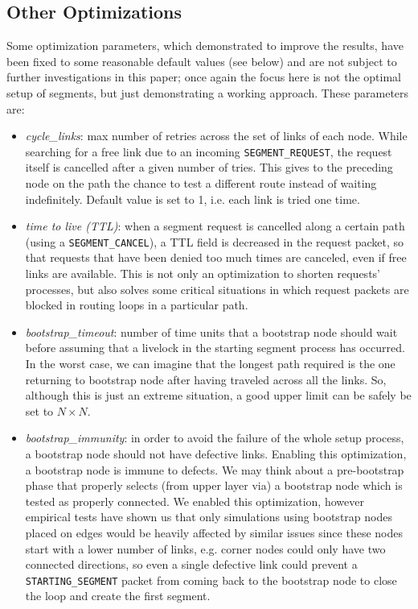 \subsection{Other Optimizations}
Some optimization parameters, which demonstrated to improve the \disr{}
results, have been fixed to some reasonable default values (see below) and are not subject to
further investigations in this paper; once again the focus here is not the
optimal setup of segments, but just demonstrating a working approach. 
These parameters are:
\begin{itemize}
\item \emph{cycle\_links}: max number of retries across the set of links of
each node. While searching for a free link due to an incoming \texttt{SEGMENT\_REQUEST},
the request itself is cancelled after a given number of tries. This
gives to the preceding node on the path the
chance to test a different route instead of waiting indefinitely.
Default value is set to 1, i.e. each link is tried one time.
\item \emph{time to live (TTL)}: when a segment request is cancelled
along a certain path (using a \texttt{SEGMENT\_CANCEL}), a TTL field is
decreased in the request packet, so that requests that have been
denied too much times are canceled, even if free links are
available. This is not only an optimization to shorten
requests' processes, but also solves some critical situations in which
request packets are blocked in routing loops in a particular path.
\item \emph{bootstrap\_timeout}: number of time units that a bootstrap node
should wait before assuming that a livelock in the starting segment
process has occurred. In the worst case, we can imagine that the longest
path required is the one returning to bootstrap node after having
traveled across all the links. So, although this is just an extreme
situation, a good upper limit can be safely be set to $N \times N$.
\item \emph{bootstrap\_immunity}: in order to avoid the failure of the whole \disr{}
setup process, a bootstrap node should not have defective links.
Enabling this optimization, a bootstrap node is immune to defects.
We may think about a pre-bootstrap phase that properly selects (from upper
layer via) a bootstrap node which is tested as properly connected. We
enabled this optimization, however empirical tests have shown us that only
simulations using bootstrap nodes placed on edges would be heavily
affected by similar issues since these nodes start with a lower number of links,
e.g. corner nodes could only have two connected directions, so even a single
defective link could prevent a \texttt{STARTING\_SEGMENT} packet from coming back to the
bootstrap node to close the loop and create the first segment.
\end{itemize}
